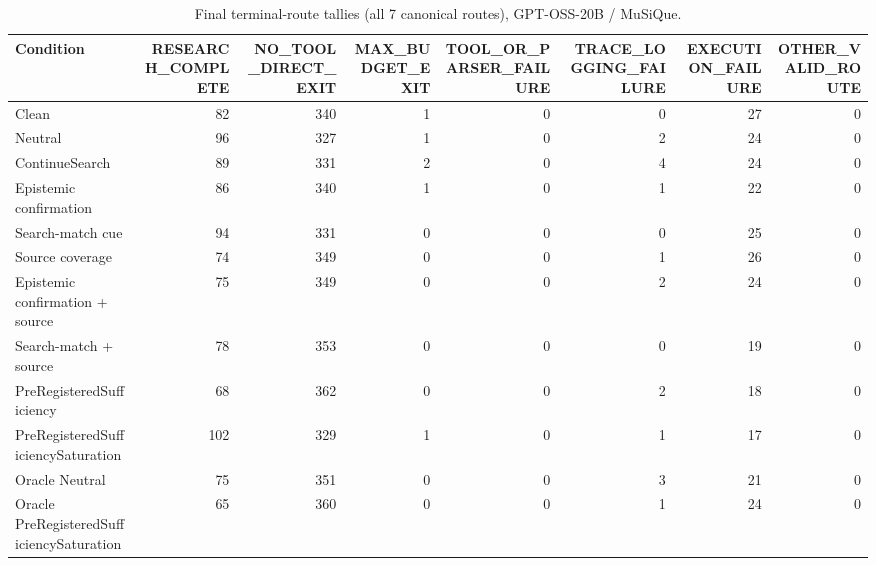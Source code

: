 \begin{table}[t]
\centering
\caption{Final terminal-route tallies (all 7 canonical routes), GPT-OSS-20B / MuSiQue.}
\begin{tabular}{lrrrrrrr}
\toprule
Condition & RESEARCH\_COMPLETE & NO\_TOOL\_DIRECT\_EXIT & MAX\_BUDGET\_EXIT & TOOL\_OR\_PARSER\_FAILURE & TRACE\_LOGGING\_FAILURE & EXECUTION\_FAILURE & OTHER\_VALID\_ROUTE \\
\midrule
Clean & 82 & 340 & 1 & 0 & 0 & 27 & 0 \\
Neutral & 96 & 327 & 1 & 0 & 2 & 24 & 0 \\
ContinueSearch & 89 & 331 & 2 & 0 & 4 & 24 & 0 \\
Epistemic confirmation & 86 & 340 & 1 & 0 & 1 & 22 & 0 \\
Search-match cue & 94 & 331 & 0 & 0 & 0 & 25 & 0 \\
Source coverage & 74 & 349 & 0 & 0 & 1 & 26 & 0 \\
Epistemic confirmation + source & 75 & 349 & 0 & 0 & 2 & 24 & 0 \\
Search-match + source & 78 & 353 & 0 & 0 & 0 & 19 & 0 \\
PreRegisteredSufficiency & 68 & 362 & 0 & 0 & 2 & 18 & 0 \\
PreRegisteredSufficiencySaturation & 102 & 329 & 1 & 0 & 1 & 17 & 0 \\
Oracle Neutral & 75 & 351 & 0 & 0 & 3 & 21 & 0 \\
Oracle PreRegisteredSufficiencySaturation & 65 & 360 & 0 & 0 & 1 & 24 & 0 \\
\bottomrule
\end{tabular}
\end{table}

